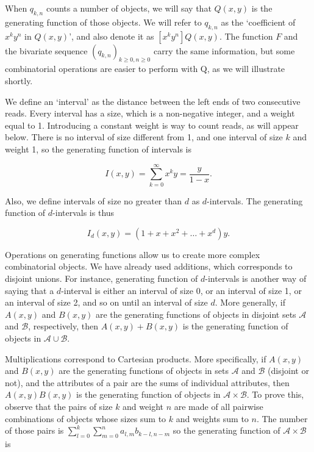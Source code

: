 \documentclass{article}
\begin{document}
When $q_{k,n}$ counts a number of objects, we will say that $Q(x,y)$ is
the generating function of those objects. We will refer to $q_{k,n}$ as
the `coefficient of $x^ky^n$ in $Q(x,y)$', and also denote it as $[x^ky^n]
Q(x,y)$. The function $F$ and the bivariate sequence $(q_{k,n})_{k \geq 0,
n \geq 0}$ carry the same information, but some combinatorial operations
are easier to perform with Q, as we will illustrate shortly.

We define an `interval' as the distance between the left ends of two
consecutive reads. Every interval has a size, which is a non-negative
integer, and a weight equal to 1. Introducing a constant weight is way to
count reads, as will appear below. There is no interval of size different
from 1, and one interval of size $k$ and weight 1, so the generating
function of intervals is

\begin{equation*}
I(x,y) = \sum_{k=0}^\infty x^ky = \frac{y}{1-x}.
\end{equation*}

Also, we define intervals of size no greater than $d$ as $d$-intervals.
The generating function of $d$-intervals is thus

\begin{equation}
\label{eq:dintervals}
I_d(x,y) = (1+x+x^2+\ldots+x^d)y.
\end{equation}

Operations on generating functions allow us to create more complex
combinatorial objects. We have already used additions, which corresponds
to disjoint unions. For instance, generating function of $d$-intervals is
another way of saying that a $d$-interval is either an interval of size 0,
or an interval of size 1, or an interval of size 2, and so on until an
interval of size $d$. More generally, if $A(x,y)$ and $B(x,y)$ are the
generating functions of objects in disjoint sets $\mathcal{A}$ and
$\mathcal{B}$, respectively, then $A(x,y)+B(x,y)$ is the generating
function of objects in $\mathcal{A} \cup \mathcal{B}$.

Multiplications correspond to Cartesian products. More specifically, if
$A(x,y)$ and $B(x,y)$ are the generating functions of objects in sets
$\mathcal{A}$ and $\mathcal{B}$ (disjoint or not), and the attributes of a
pair are the sums of individual attributes, then $A(x,y)B(x,y)$ is the
generating function of objects in $\mathcal{A} \times \mathcal{B}$. To
prove this, observe that the pairs of size $k$ and weight $n$ are made of
all pairwise combinations of objects whose sizes sum to $k$ and weights
sum to $n$. The number of those pairs is $\sum_{l=0}^k \sum_{m=0}^n
a_{l,m}b_{k-l,n-m}$ so the generating function of $\mathcal{A} \times
\mathcal{B}$ is
\end{document}
